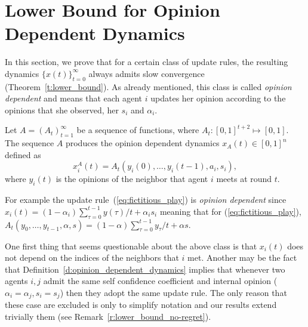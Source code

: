 \section{Lower Bound for Opinion Dependent Dynamics}\label{s:lower_bound}
In this section, we prove that for a
certain class of update rules, the resulting dynamics
$\{x(t)\}_{t=0}^\infty$ always admits slow convergence (Theorem~\ref{t:lower_bound}).
As already mentioned, this class is called \emph{opinion dependent}
and means that each agent $i$ updates her opinion according
to the opinions that she observed, her $s_i$ and $\alpha_i$.
\begin{definition}\label{d:opinion_dependent_dynamics}
  Let $A = (A_t)_{t=1}^{\infty}$ be a sequence of functions,
  where $A_t : [0,1]^{t+2} \mapsto [0,1]$. The sequence
  $A$ produces the opinion
  dependent dynamics $x_A(t)\in[0,1]^n$ defined as
  \[
    x^A_i(t) = A_t(y_i(0),\ldots, y_i(t-1), a_i, s_i),
  \]
  where $y_i(t)$ is the opinions of the neighbor that agent $i$ meets
  at round $t$.
\end{definition}
%
For example the update rule~(\ref{eq:fictitious_play}) is \emph{opinion dependent} since
$x_i(t) = (1-\alpha_i)\sum_{\tau=0}^{t-1}y(\tau)/t + \alpha_is_i$
meaning that for (\ref{eq:fictitious_play}), $A_t(y_0,\ldots,y_{t-1},\alpha,s) =
(1-\alpha)\sum_{\tau=0}^{t-1}y_\tau/t + \alpha s$.

One first thing that seems questionable about the above class is that
$x_i(t)$ does not depend on the indices of the neighbors that $i$ met. Another
may be the fact that Definition~\ref{d:opinion_dependent_dynamics}
implies that whenever two agents $i,j$ admit the same self confidence coefficient
and internal opinion ($\alpha_i=\alpha_j,s_i=s_j$) then they adopt the same update rule.
The only reason that these case are excluded is only to simplify notation and our
results extend trivially them (see Remark~\ref{r:lower_bound_no-regret}).

